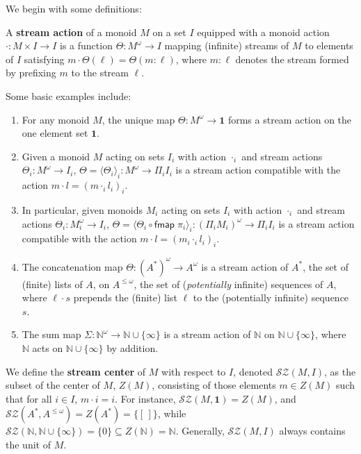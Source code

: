 \documentclass[acmsmall,screen,review]{acmart}
\newcommand{\mc}[1]{\ensuremath{\mathcal{#1}}}
\newcommand{\ms}[1]{\ensuremath{\mathsf{#1}}}
\newcommand{\nats}{\mathbb{N}}
\begin{document}
We begin with some definitions:
\begin{definition}
  A \textbf{stream action} of a monoid \(M\) on a set \(I\) equipped with a
  monoid action \(\cdot: M \times I \to I\) is a function \(\Theta: M^\omega \to
  I\) mapping (infinite) streams of \(M\) to elements of \(I\) satisfying
  \(
    m \cdot \Theta(\ell) = \Theta(m \colon \ell)
  \),
  where \(m \colon \ell\) denotes the stream formed by prefixing \(m\) to the
  stream \(\ell\).
\end{definition}
Some basic examples include:
\begin{enumerate}
  \item For any monoid \(M\), the unique map \(\Theta: M^\omega \to \mathbf{1}\)
  forms a stream action on the one element set \(\mathbf{1}\).
  \item Given a monoid \(M\) acting on sets \(I_i\) with action \(\cdot_i\) and
  stream actions \(\Theta_i: M^\omega \to I_i\), \(\Theta =
  \langle\Theta_i\rangle_i: M^\omega \to \Pi_iI_i\) is a stream action
  compatible with the action \(m \cdot l = (m \cdot_i l_i)_i\).
  \item In particular, given monoids \(M_i\) acting on sets \(I_i\) with action
  \(\cdot_i\) and stream actions \(\Theta_i: M_i^\omega \to I_i\), \(\Theta =
  \langle \Theta_i \circ \ms{fmap}\;\pi_i\rangle_i: (\Pi_iM_i)^\omega \to
  \Pi_iI_i\) is a stream action compatible with the action \(m \cdot l = (m_i
  \cdot_i l_i)_i\).
  \item The concatenation map \(\Theta: (A^*)^\omega \to A^\omega\) is a stream
  action of \(A^*\), the set of (finite) lists of \(A\), on \(A^{\leq \omega}\),
  the set of (\textit{potentially} infinite) sequences of \(A\), where \(\ell
  \cdot s\) prepends the (finite) list \(\ell\) to the (potentially infinite)
  sequence \(s\).
  \item The sum map \(\Sigma: \nats^\omega \to \nats \cup \{\infty\}\) is a
  stream action of \(\nats\) on \(\nats \cup \{\infty\}\), where \(\nats\) acts
  on \(\nats \cup \{\infty\}\) by addition.
\end{enumerate}
We define the \textbf{stream center} of \(M\) with respect to \(I\), denoted
\(\mc{SZ}(M, I)\), as the subset of the center of \(M\), \(Z(M)\), consisting of
those elements \(m \in Z(M)\) such that for all \(i \in I\), \(m \cdot i = i\).
For instance, \(\mc{SZ}(M, \mathbf{1}) = Z(M)\), and \(\mc{SZ}(A^*, A^{\leq
\omega}) = Z(A^*) = \{[\,]\}\), while \(\mc{SZ}(\nats, \nats \cup \{\infty\}) =
\{0\} \subseteq Z(\nats) = \nats\). Generally, \(\mc{SZ}(M, I)\) always contains
the unit of \(M\).
\end{document}
